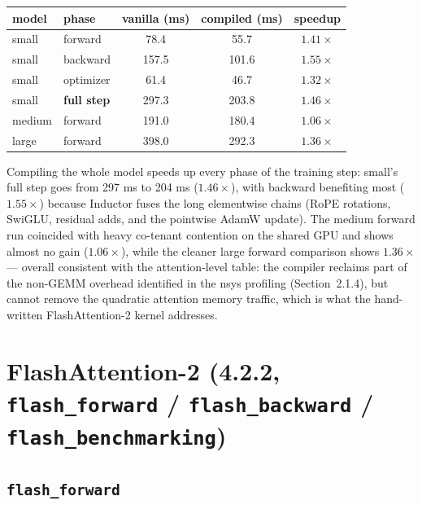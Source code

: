 \documentclass[11pt]{article}
\begin{document}
\begin{center}
\begin{tabular}{llccc}
\toprule
model & phase & vanilla (ms) & compiled (ms) & speedup \\
\midrule
small  & forward   & 78.4  & 55.7  & $1.41\times$ \\
small  & backward   & 157.5 & 101.6 & $1.55\times$ \\
small  & optimizer  & 61.4  & 46.7  & $1.32\times$ \\
small  & \textbf{full step} & 297.3 & 203.8 & $1.46\times$ \\
medium & forward    & 191.0 & 180.4 & $1.06\times$ \\
large  & forward    & 398.0 & 292.3 & $1.36\times$ \\
\bottomrule
\end{tabular}
\end{center}

Compiling the whole model speeds up every phase of the training step: small's full step goes from
297 ms to 204 ms ($1.46\times$), with backward benefiting most ($1.55\times$) because Inductor fuses
the long elementwise chains (RoPE rotations, SwiGLU, residual adds, and the pointwise AdamW update).
The medium forward run coincided with heavy co-tenant contention on the shared GPU and shows almost
no gain ($1.06\times$), while the cleaner large forward comparison shows $1.36\times$ --- overall
consistent with the attention-level table: the compiler reclaims part of the non-GEMM overhead
identified in the nsys profiling (Section~2.1.4), but cannot remove the quadratic attention memory
traffic, which is what the hand-written FlashAttention-2 kernel addresses.

\section{FlashAttention-2 (4.2.2, \texttt{flash\_forward} / \texttt{flash\_backward} /
\texttt{flash\_benchmarking})}

\subsection{\texttt{flash\_forward}}
\end{document}
